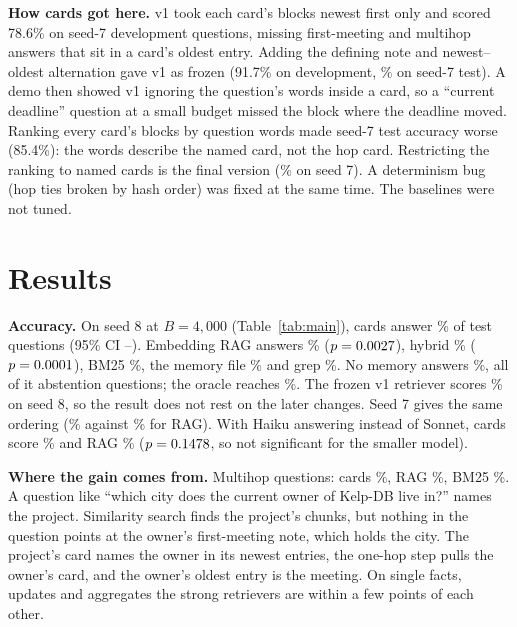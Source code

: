\documentclass[11pt]{article}
\begin{document}
\textbf{How cards got here.} v1 took each card's blocks newest first only and scored 78.6\% on seed-7 development
questions, missing first-meeting and multihop answers that sit in a card's oldest entry. Adding the defining note and
newest--oldest alternation gave v1 as frozen (91.7\% on development, \SevenCardsVoneFourAcc\% on seed-7 test). A
demo then showed v1 ignoring the question's words inside a card, so a ``current deadline'' question at a small budget
missed the block where the deadline moved. Ranking every card's blocks by question words made seed-7 test accuracy
worse (85.4\%): the words describe the named card, not the hop card. Restricting the ranking to named cards is the
final version (\SevenCardsFourAcc\% on seed 7). A determinism bug (hop ties broken by hash order) was fixed at the
same time. The baselines were not tuned.

\section{Results}\label{sec:results}



\textbf{Accuracy.} On seed 8 at $B=4{,}000$ (Table~\ref{tab:main}), cards answer \MainCardsFourAcc\% of test
questions (95\% CI \MainCardsFourLo--\MainCardsFourHi). Embedding RAG answers \MainRagFourAcc\% ($p=0.0027$),
hybrid \MainHybridFourAcc\% ($p=0.0001$), BM25 \MainBmFourAcc\%, the memory file \MainMemoryFourAcc\% and
grep \MainGrepFourAcc\%. No memory answers \MainNoneFourAcc\%, all of it abstention questions; the oracle reaches
\MainOracleFourAcc\%. The frozen v1 retriever scores \MainCardsVoneFourAcc\% on seed 8, so the result does not rest on
the later changes. Seed 7 gives the same ordering (\SevenCardsFourAcc\% against \SevenRagFourAcc\% for RAG). With Haiku
answering instead of Sonnet, cards score \HaikuCardsFourAcc\% and RAG \HaikuRagFourAcc\% ($p=0.1478$, so
not significant for the smaller model).

\textbf{Where the gain comes from.} Multihop questions: cards \MainCardsFourMultihop\%, RAG \MainRagFourMultihop\%,
BM25 \MainBmFourMultihop\%. A question like ``which city does the current owner of Kelp-DB live in?'' names the
project. Similarity search finds the project's chunks, but nothing in the question points at the owner's
first-meeting note, which holds the city. The project's card names the owner in its newest entries, the one-hop step
pulls the owner's card, and the owner's oldest entry is the meeting. On single facts, updates and aggregates the
strong retrievers are within a few points of each other.
\end{document}
